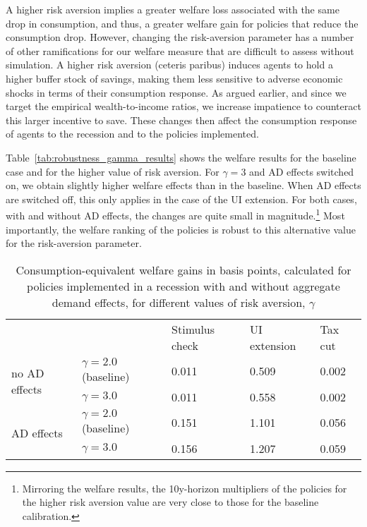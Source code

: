 \documentclass[\latexroot/\projectname]{subfiles}
\begin{document}
A higher risk aversion implies a greater welfare loss associated with the same drop in consumption, and thus, a greater welfare gain for policies that reduce the consumption drop.
However, changing the risk-aversion parameter has a number of other ramifications for our welfare measure that are difficult to assess without simulation.
A higher risk aversion (ceteris paribus) induces agents to hold a higher buffer stock of savings, making them less sensitive to adverse economic shocks in terms of their consumption response.
As argued earlier, and since we target the empirical wealth-to-income ratios, we increase impatience to counteract this larger incentive to save.
These changes then affect the consumption response of agents to the recession and to the policies implemented.

Table~\ref{tab:robustness_gamma_results} shows the welfare results for the baseline case and for the higher value of risk aversion.
For $\gamma=3$ and AD effects switched on, we obtain slightly higher welfare effects than in the baseline.
When AD effects are switched off, this only applies in the case of the UI extension.
For both cases, with and without AD effects, the changes are quite small in magnitude.\footnote{Mirroring the welfare results, the 10y-horizon multipliers of the policies for the higher risk aversion value are very close to those for the baseline calibration.} Most importantly, the welfare ranking of the policies is robust to this alternative value for the risk-aversion parameter.

\begin{table}[htbp]
  \begin{center}
    \begin{tabular}
      {@{}lllll@{}}
      \toprule
       &                           & Stimulus check & UI extension & Tax cut \\ \cmidrule(l){1-5}
      \multirow{2}{*}{no AD effects}
       & $\gamma = 2.0$ (baseline) & 0.011          & 0.509        & 0.002   \\
       & $\gamma = 3.0$            & 0.011          & 0.558        & 0.002   \\ \cmidrule(l){1-5}
      \multirow{2}{*}{AD effects}
       & $\gamma = 2.0$ (baseline) & 0.151          & 1.101        & 0.056   \\
       & $\gamma = 3.0$            & 0.156          & 1.207        & 0.059   \\ \cmidrule(l){1-5}
    \end{tabular}
    \caption{Consumption-equivalent welfare gains in basis points, calculated for policies implemented in a recession with and without aggregate demand effects, for different values of risk aversion, $\gamma$}
    \whenintegrated{\label{tab:robustness_gamma_results}} 
  \end{center}
\end{table}
\end{document}
